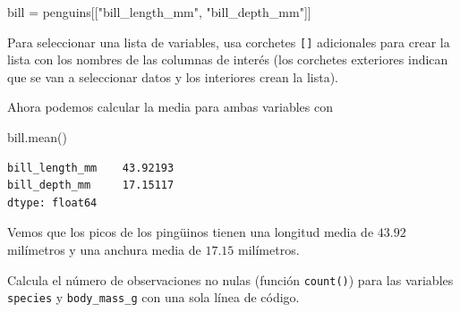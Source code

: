 \documentclass[
  a4paper,
  noprof,
  12pt,
  notoc,
  nosols,
  nobib]{mnye}
\newenvironment{Shaded}{\begin{snugshade}}{\end{snugshade}}
\newcommand{\NormalTok}[1]{\textcolor[rgb]{0.00,0.23,0.31}{#1}}
\newcommand{\OperatorTok}[1]{\textcolor[rgb]{0.37,0.37,0.37}{#1}}
\newcommand{\StringTok}[1]{\textcolor[rgb]{0.13,0.47,0.30}{#1}}
\renewenvironment{exercise}[1][]{
            \if\relax\detokenize{#1}\relax
                \ex
            \else
                \ex[note={#1}]
            \fi
        }{\endex}
\theoremstyle{definition}
\newtheorem{exercise}{Ejercicio}[section]
\theoremstyle{remark}
\begin{document}
\begin{Shaded}
\begin{Highlighting}[]
\NormalTok{bill }\OperatorTok{=}\NormalTok{ penguins[[}\StringTok{"bill\_length\_mm"}\NormalTok{, }\StringTok{"bill\_depth\_mm"}\NormalTok{]]}
\end{Highlighting}
\end{Shaded}

\begin{tcolorbox}[enhanced jigsaw, bottomrule=.15mm, colframe=quarto-callout-note-color-frame, toprule=.15mm, leftrule=.75mm, breakable, left=2mm, arc=.35mm, rightrule=.15mm, colback=white, opacityback=0]
\begin{minipage}[t]{5.5mm}
\textcolor{quarto-callout-note-color}{\faInfo}
\end{minipage}%
\begin{minipage}[t]{\textwidth - 5.5mm}

Para seleccionar una lista de variables, usa corchetes \texttt{{[}{]}}
adicionales para crear la lista con los nombres de las columnas de
interés (los corchetes exteriores indican que se van a seleccionar datos
y los interiores crean la lista).

\end{minipage}%
\end{tcolorbox}

Ahora podemos calcular la media para ambas variables con

\begin{Shaded}
\begin{Highlighting}[]
\NormalTok{bill.mean()}
\end{Highlighting}
\end{Shaded}

\begin{verbatim}
bill_length_mm    43.92193
bill_depth_mm     17.15117
dtype: float64
\end{verbatim}

Vemos que los picos de los pingüinos tienen una longitud media de
\(43.92\) milímetros y una anchura media de \(17.15\) milímetros.

\begin{exercise}[]%
\protect\hypertarget{exr-subset-variables-3}{}\label{exr-subset-variables-3}%
Calcula el número de observaciones no nulas (función \texttt{count()})
para las variables \texttt{species} y \texttt{body\_mass\_g} con una
sola línea de código.

\end{exercise}
\end{document}
